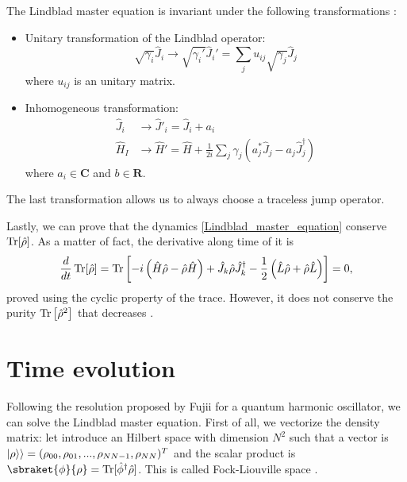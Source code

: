 The Lindblad master equation is invariant under the following transformations \cite{Breuer-Petruccione}:
\begin{itemize}
    \item Unitary transformation of the Lindblad operator:
        \begin{equation}
            \sqrt{\gamma_i}\hat J_i \rightarrow \sqrt{\gamma_i'}\hat J_i' = \sum_j u_{ij}\sqrt{\gamma_j}\hat J_j
        \end{equation}
        where $u_{ij}$ is an unitary matrix.
    \item Inhomogeneous transformation:
        \begin{equation}
            \begin{split}
                \hat J_i &\rightarrow \hat J'_i = \hat J_i + a_i\\
                \hat H_I &\rightarrow \hat H' = \hat H + \frac{1}{2i}\sum_j\gamma_j\left(a^*_j\hat J_j -a_j\hat J_j^\dagger\right)
            \end{split}
        \end{equation}
        where $a_i \in\mathbf{C}$ and $b \in \mathbf{R}$.
\end{itemize}
The last transformation allows us to always choose a traceless jump operator.

Lastly, we can prove that the dynamics \eqref{Lindblad_master_equation} conserve $\operatorname{Tr}[\hat\rho]$. As a matter of fact, the derivative along time of it is
\begin{equation}\label{Lindblad_master_equation}
    \frac{d}{dt}\operatorname{Tr}[\hat\rho] = \operatorname{Tr}\left[-i\left(\hat H\hat\rho - \hat\rho\hat H \right) +  \hat J_k \hat\rho \hat J_k^\dagger -\frac{1}{2} \left(\hat L\hat\rho + \hat\rho\hat L\right)\right] = 0,
\end{equation}
proved using the cyclic property of the trace. 
However, it does not conserve the purity $\operatorname{Tr}\left[\hat\rho^2\right]$ that decreases \cite{Manzano}. 

\section{Time evolution}
Following the resolution proposed by Fujii \cite{fujii2012} for a quantum harmonic oscillator, we can solve the Lindblad master equation. 
First of all, we vectorize the density matrix: let introduce an Hilbert space with dimension $N^2$ such that a vector is $\lvert\rho\rangle\rangle = (\rho_{00},\rho_{01},...,\rho_{NN-1},\rho_{NN})^T$ and the scalar product is $\sbraket{\phi}{\rho}= \Tr[\hat\phi^\dagger\hat\rho]$. This is called Fock-Liouville space \cite{Manzano}.

